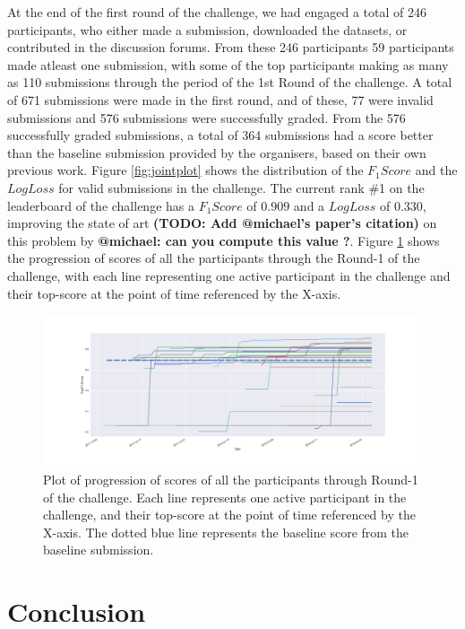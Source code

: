 \documentclass[sigconf]{acmart}
\begin{document}
At the end of the first round of the challenge, we had engaged a total of 246 participants, who either made a submission, downloaded the datasets, or contributed in the discussion forums. From these 246 participants 59 participants made atleast one submission,   with some of the top participants making as many as 110 submissions through the period of the 1st Round of the challenge. 
A total of 671 submissions were made in the first round, and of these, 77 were invalid submissions and 576 submissions were successfully graded. 
From the 576 successfully graded submissions, a total of 364 submissions had a score better than the baseline submission provided by the organisers, based on their own previous work. Figure \ref{fig:jointplot} shows the distribution of the $F_1 Score$ and the $Log Loss$ for valid submissions in the challenge.
The current rank \#1 on the leaderboard of the challenge has a $F_1 Score$ of $0.909$ and a $LogLoss$ of $0.330$, improving the state of art \textbf{(TODO: Add @michael's paper's citation)}  on this problem by \textbf{@michael: can you compute this value ?}.
Figure \ref{fig:timeline} shows the progression of scores of all the participants through the Round-1 of the challenge, with each line representing one active participant in the challenge and their top-score at the point of time referenced by the X-axis.

\begin{figure}[h]
\label{fig:timeline}
\includegraphics[width=\linewidth]{images/plot-2}
\caption{ Plot of progression of scores of all the participants through Round-1 of the challenge. Each line represents one active participant in the challenge, and their top-score at the point of time referenced by the X-axis. The dotted blue line represents the baseline score from the baseline submission.}
\end{figure}

\section{Conclusion}
\end{document}
